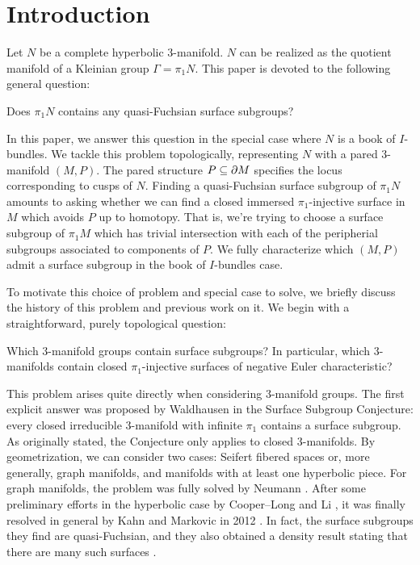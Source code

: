 \section{Introduction}

Let $N$ be a complete hyperbolic $3$-manifold. $N$ can be realized as the
quotient manifold of a Kleinian group $\Gamma=\pi_1N$. This paper is devoted to
the following general question:

\begin{prob}

Does $\pi_1N$ contains any quasi-Fuchsian surface subgroups?

\end{prob}

In this paper, we answer this question in the special case where $N$ is a book
of $I$-bundles. We tackle this problem topologically, representing $N$ with
a pared $3$-manifold $(M,P)$.  The pared structure $P\subseteq\partial M$ specifies the
locus corresponding to cusps of $N$. Finding a quasi-Fuchsian surface subgroup
of $\pi_1N$ amounts to asking whether we can find a closed immersed
$\pi_1$-injective surface in $M$ which avoids $P$ up to homotopy.  That is,
we're trying to choose a surface subgroup of $\pi_1M$ which has trivial
intersection with each of the peripherial subgroups associated to components of
$P$.  We fully characterize which $(M,P)$ admit a surface subgroup in the book
of $I$-bundles case.

To motivate this choice of problem and special case to solve, we briefly
discuss the history of this problem and previous work on it. We begin with
a straightforward, purely topological question:

\begin{prob}

Which $3$-manifold groups contain surface subgroups? In particular, which
$3$-manifolds contain closed $\pi_1$-injective surfaces of negative Euler
characteristic?

\end{prob}

This problem arises quite directly when considering $3$-manifold groups. The
first explicit answer was proposed by Waldhausen \cite{Kirby} in
the Surface Subgroup Conjecture: every closed irreducible $3$-manifold with
infinite $\pi_1$ contains a surface subgroup. As originally stated, the
Conjecture only applies to closed $3$-manifolds. By geometrization, we can
consider two cases: Seifert fibered spaces or, more generally, graph manifolds,
and manifolds with at least one hyperbolic piece. For graph manifolds, the
problem was fully solved by Neumann \cite{Neu}.  After some preliminary
efforts in the hyperbolic case by Cooper--Long \cite{CooperLong} and Li
\cite{Li}, it was finally resolved in general by Kahn and Markovic in
2012 \cite{KM}.  In fact, the surface subgroups they find are quasi-Fuchsian,
and they also obtained a density result stating that there are many such
surfaces \cite{KM2}.


